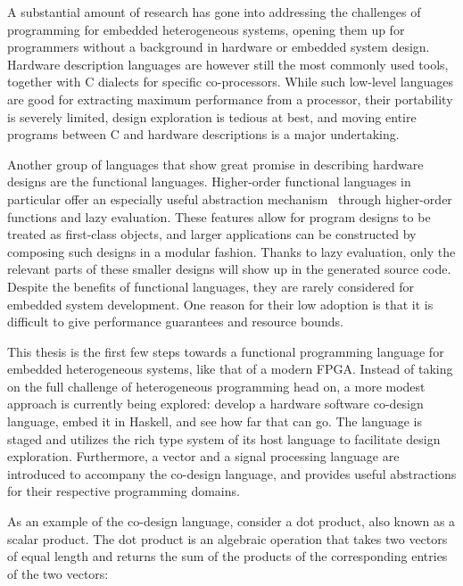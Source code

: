 \documentclass[../paper.tex]{subfiles}
\begin{document}
A substantial amount of research has gone into addressing the challenges of programming for embedded heterogeneous systems, opening them up for programmers without a background in hardware or embedded system design. Hardware description languages are however still the most commonly used tools, together with C dialects for specific co-processors. While such low-level languages are good for extracting maximum performance from a processor, their portability is severely limited, design exploration is tedious at best, and moving entire programs between C and hardware descriptions is a major undertaking.

Another group of languages that show great promise in describing hardware designs are the functional languages. Higher-order functional languages in particular offer an especially useful abstraction mechanism~\cite{baaij2010, bjesse1998, gill2010} through higher-order functions and lazy evaluation. These features allow for program designs to be treated as first-class objects, and larger applications can be constructed by composing such designs in a modular fashion. Thanks to lazy evaluation, only the relevant parts of these smaller designs will show up in the generated source code. Despite the benefits of functional languages, they are rarely considered for embedded system development. One reason for their low adoption is that it is difficult to give performance guarantees and resource bounds.


This thesis is the first few steps towards a functional programming language for embedded heterogeneous systems, like that of a modern FPGA. Instead of taking on the full challenge of heterogeneous programming head on, a more modest approach is currently being explored: develop a hardware software co-design language, embed it in Haskell, and see how far that can go. The language is staged and utilizes the rich type system of its host language to facilitate design exploration. Furthermore, a vector and a signal processing language are introduced to accompany the co-design language, and provides useful abstractions for their respective programming domains.

As an example of the co-design language, consider a dot product, also known as a scalar product. The dot product is an algebraic operation that takes two vectors of equal length and returns the sum of the products of the corresponding entries of the two vectors:
\end{document}
